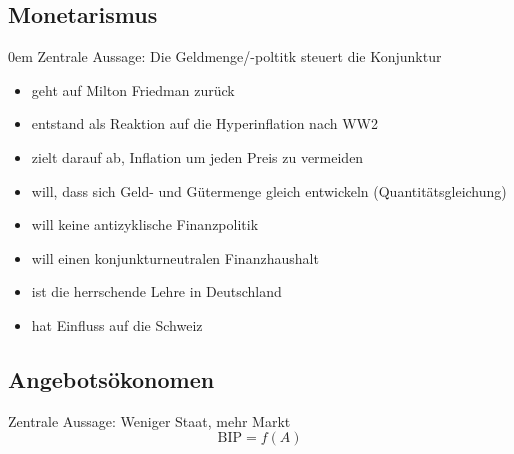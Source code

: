 \subsection{Monetarismus}\itemsep0em
Zentrale Aussage: Die Geldmenge/-poltitk steuert die Konjunktur
\begin{itemize}\itemsep0em
	\item geht auf Milton Friedman zurück
	\item entstand als Reaktion auf die Hyperinflation nach WW2
	\item zielt darauf ab, Inflation um jeden Preis zu vermeiden
	\item will, dass sich Geld- und Gütermenge gleich entwickeln (Quantitätsgleichung)
	\item will keine antizyklische Finanzpolitik
	\item will einen konjunkturneutralen Finanzhaushalt 
	\item ist die herrschende Lehre in Deutschland
	\item hat Einfluss auf die Schweiz
\end{itemize}


\subsection{Angebotsökonomen}
Zentrale Aussage: Weniger Staat, mehr Markt
\begin{equation*}
	\mbox{BIP} =  f(A)
\end{equation*}

